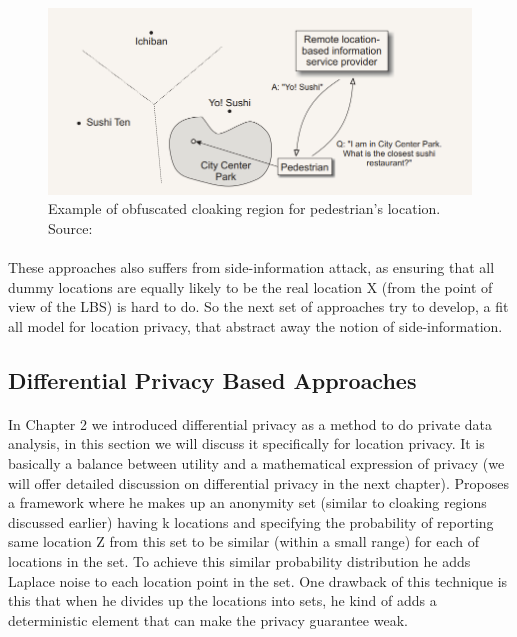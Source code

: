 \documentclass{report}
\begin{document}
\begin{figure}[ht]
\centering
        \includegraphics[width=120mm,scale=1]{Images/obfuscationRegion.PNG}
    \caption{Example of obfuscated cloaking region for pedestrian's location. Source:\cite{duckham2005formal}}
    \label{fig:obfuscationRegion}
\end{figure}

\paragraph{}
These approaches also suffers from side-information attack, as ensuring that all dummy locations are equally likely to be the real location X (from the point of view of the LBS) is hard to do. So the next set of approaches try to develop, a fit all model for location privacy, that abstract away the notion of side-information.



\subsection{Differential Privacy Based Approaches}
\paragraph{}
In Chapter 2 we introduced differential privacy as a method to do private data analysis, in this section we will discuss it specifically for location privacy. It is basically a balance between utility and a mathematical expression of privacy (we will offer detailed discussion on differential privacy in the next chapter).
\cite{dewri2013local} Proposes a framework where he makes up an anonymity set (similar to cloaking regions discussed earlier) having k locations and specifying the probability of reporting same location Z from this set to be similar (within a small range) for each of locations in the set. To achieve this similar probability distribution he adds Laplace noise to each location point in the set. One drawback of this technique is this that when he divides up the locations into sets, he kind of adds a deterministic element that can make the privacy guarantee weak. 
\end{document}
